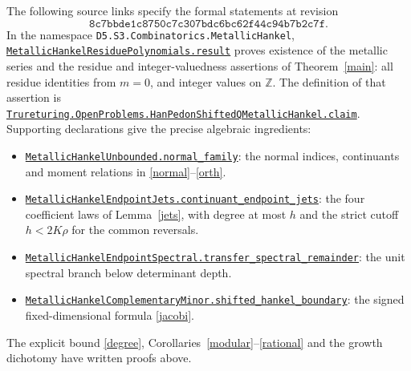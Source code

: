 \documentclass[11pt,a4paper]{article}
\newcommand{\Z}{\mathbb Z}
\begin{document}
The following source links specify the formal statements at revision
\[
\texttt{8c7bbde1c8750c7c307bdc6bc62f44c94b7b2c7f}.
\]
In the namespace
\texttt{D5.S3.Combinatorics.MetallicHankel},
\href{https://github.com/the-omega-institute/trureturing/blob/8c7bbde1c8750c7c307bdc6bc62f44c94b7b2c7f/D5/S3/Combinatorics/MetallicHankel/MetallicHankelResiduePolynomials.lean}{\nolinkurl{MetallicHankelResiduePolynomials.result}}
proves existence of the metallic series and the residue and integer-valuedness
assertions of Theorem~\ref{main}: all residue identities from $m=0$, and integer values
on $\Z$. The definition of that assertion is
\href{https://github.com/the-omega-institute/trureturing/blob/8c7bbde1c8750c7c307bdc6bc62f44c94b7b2c7f/D5/S3/Combinatorics/MetallicHankel/MetallicHankelQuasipolynomialDefs.lean}{\nolinkurl{Trureturing.OpenProblems.HanPedonShiftedQMetallicHankel.claim}}.
Supporting declarations give the precise algebraic ingredients:
\begin{itemize}
\item
\href{https://github.com/the-omega-institute/trureturing/blob/8c7bbde1c8750c7c307bdc6bc62f44c94b7b2c7f/D5/S3/Combinatorics/MetallicHankel/MetallicHankelUnbounded.lean}{\nolinkurl{MetallicHankelUnbounded.normal_family}}:
the normal indices, continuants and moment relations in \eqref{normal}--\eqref{orth}.
\item
\href{https://github.com/the-omega-institute/trureturing/blob/8c7bbde1c8750c7c307bdc6bc62f44c94b7b2c7f/D5/S3/Combinatorics/MetallicHankel/MetallicHankelEndpointJets.lean}{\nolinkurl{MetallicHankelEndpointJets.continuant_endpoint_jets}}:
the four coefficient laws of Lemma~\ref{jets}, with degree at most $h$
and the strict cutoff $h<2K\rho$ for the common reversals.
\item
\href{https://github.com/the-omega-institute/trureturing/blob/8c7bbde1c8750c7c307bdc6bc62f44c94b7b2c7f/D5/S3/Combinatorics/MetallicHankel/MetallicHankelEndpointSpectral.lean}{\nolinkurl{MetallicHankelEndpointSpectral.transfer_spectral_remainder}}:
the unit spectral branch below determinant depth.
\item
\href{https://github.com/the-omega-institute/trureturing/blob/8c7bbde1c8750c7c307bdc6bc62f44c94b7b2c7f/D5/S3/Combinatorics/MetallicHankel/MetallicHankelComplementaryMinor.lean}{\nolinkurl{MetallicHankelComplementaryMinor.shifted_hankel_boundary}}:
the signed fixed-dimensional formula \eqref{jacobi}.
\end{itemize}
The explicit bound \eqref{degree}, Corollaries~\ref{modular}--\ref{rational}
and the growth dichotomy have written proofs above.
\end{document}
